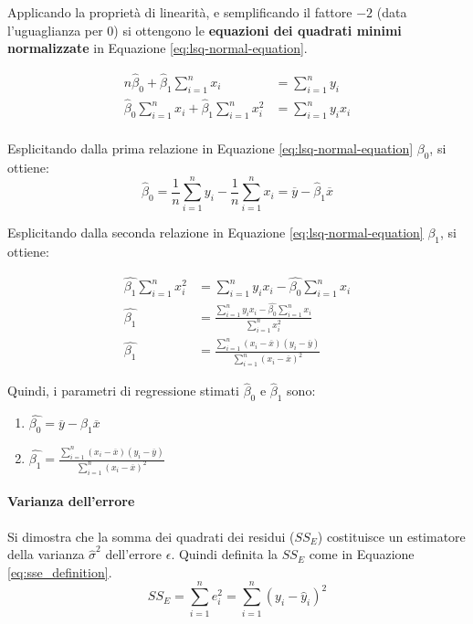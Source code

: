 \documentclass{article}
\begin{document}
Applicando la proprietà di linearità, e semplificando il fattore $-2$ (data l'uguaglianza per 
$0$) si ottengono le \textbf{equazioni dei quadrati minimi normalizzate} in Equazione 
\ref{eq:lsq-normal-equation}.

\begin{align}
  \label{eq:lsq-normal-equation}
  n\hat{\beta}_0 + \hat{\beta}_1 \displaystyle\sum_{i=1}^{n} x_i &= 
  \displaystyle\sum_{i=1}^{n}y_i\\ 
  \hat{\beta}_0 \displaystyle\sum_{i=1}^{n}x_i + \hat{\beta}_1 \displaystyle\sum_{i=1}^{n}x_i^2 &= 
  \displaystyle\sum_{i=1}^{n}y_ix_i\\ 
\end{align}

Esplicitando dalla prima relazione in Equazione \ref{eq:lsq-normal-equation} $\beta_0$, si 
ottiene:
\[
  \hat{\beta}_0 = \frac{1}{n} \displaystyle\sum_{i=1}^{n}y_i - \frac{1}{n}
  \displaystyle\sum_{i=1}^{n}x_i = \overline{y} - \hat{\beta}_1\overline{x}
\]

Esplicitando dalla seconda relazione in Equazione \ref{eq:lsq-normal-equation} $\beta_1$, si 
ottiene:

\begin{align*}
  \hat{\beta_1} \displaystyle\sum_{i=1}^{n}x_i^2 &= \displaystyle\sum_{i=1}^{n}y_ix_i - 
  \hat{\beta_0} \displaystyle\sum_{i=1}^{n} x_i\\
  \hat{\beta_1} &= \displaystyle\frac{\displaystyle\sum_{i=1}^{n}y_ix_i - 
  \hat{\beta_0} \displaystyle\sum_{i=1}^{n} x_i} {\displaystyle\sum_{i=1}^{n}x_i^2}\\
  \hat{\beta_1} &= \displaystyle\frac{\displaystyle\sum_{i=1}^{n}(x_i - \overline{x})
  (y_i - \overline{y})}{\displaystyle\sum_{i=1}^{n}(x_i - \overline{x})^2}
\end{align*}

Quindi, i parametri di regressione stimati $\hat{\beta}_0$ e $\hat{\beta}_1$ sono:
\begin{enumerate}[label=(\alph*)] 
  \item $\hat{\beta_0} = \overline{y} - \beta_1\overline{x}$
  \item $\hat{\beta_1} = \displaystyle\frac{\displaystyle\sum_{i=1}^{n}(x_i - \overline{x})(y_i - \overline{y})}
    {\displaystyle\sum_{i=1}^{n}(x_i - \overline{x})^2}$
\end{enumerate}

\paragraph{Varianza dell'errore}Si dimostra che la somma dei quadrati dei residui ($SS_E$) 
costituisce un estimatore della varianza $\hat{\sigma}^2$ dell'errore $\epsilon$. Quindi 
definita la $SS_E$ come in Equazione \ref{eq:sse_definition}.
\begin{equation}
  SS_E = \displaystyle\sum_{i=1}^{n}e_i^2 = \displaystyle\sum_{i=1}^{n}(y_i - \hat{y}_i)^2
  \label{eq:sse_definition}
\end{equation}
\end{document}
